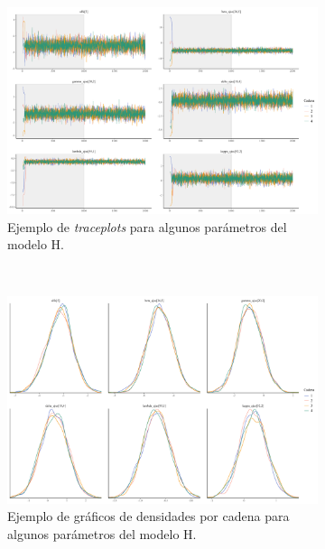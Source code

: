 \begin{figure}
	\centering
	\begin{subfigure}{0.45\textwidth}
	\includegraphics[width = \textwidth]{Figs/Convergencia/Convergencia_Traceplots}
	\caption{Ejemplo de \textit{traceplots} para algunos parámetros del modelo H.}
	\label{fig:Traceplots_H}
	\end{subfigure}
	~
	\begin{subfigure}{0.45\textwidth}
	\includegraphics[width = \textwidth]{Figs/Convergencia/Convergencia_Densidades}
	\caption{Ejemplo de gráficos de densidades por cadena para algunos parámetros del modelo H.}
	\label{fig:Densidades_H}
	\end{subfigure}
	~
	\begin{subfigure}{0.6\textwidth}

\end{subfigure}
\end{figure}
